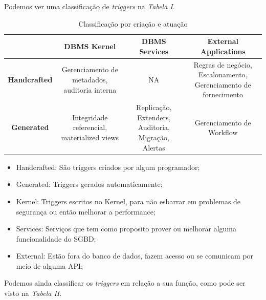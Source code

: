 \documentclass[conference]{IEEEtran}
\begin{document}
    Podemos ver uma classificação de \textit{triggers} na \textit{Tabela I}.

 \begin{table}[!t]
    \renewcommand{\arraystretch}{1}
    \caption{Classificação por criação e atuação}
    \label{table_example}
    \centering
    \begin{tabular}{ c  c  c  c  }
      \hline 
	 & \bfseries DBMS Kernel & \bfseries DBMS Services & \bfseries External Applications \\
        \hline
            \bfseries Handcrafted &
            Gerenciamento de metadados, auditoria interna &
            NA &
            Regras de negócio, Escalonamento, Gerenciamento de fornecimento\\
	\hline
            \bfseries Generated &
            Integridade referencial, materialized views &
            Replicação, Extenders, Auditoria, Migração, Alertas &
            Gerenciamento de Workflow \\
	\hline
        \end{tabular}
    \end{table}

    \begin{itemize}
        \item{Handcrafted}: São triggers criados por algum programador;
        \item{Generated}: Triggers gerados automaticamente;
        \item{Kernel}: Triggers escritos no Kernel, para não esbarrar em problemas de segurança ou então melhorar a performance;
        \item{Services}: Serviços que tem como proposito prover ou melhorar alguma funcionalidade do SGBD;
        \item{External}: Estão fora do banco de dados, fazem acesso ou se comunicam por meio de alguma API;
    \end{itemize}

    Podemos ainda classificar os \textit{triggers} em relação a sua função, como pode ser visto na \textit{Tabela II}.
\end{document}
